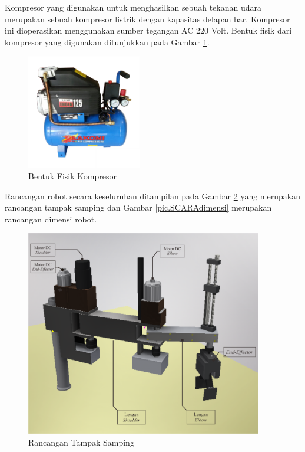 Kompresor yang digunakan untuk menghasilkan sebuah tekanan udara merupakan sebuah kompresor listrik dengan kapasitas delapan bar. Kompresor ini dioperasikan menggunakan sumber tegangan AC 220 Volt. Bentuk fisik dari kompresor yang digunakan ditunjukkan pada Gambar \ref{pic.kompresor}.
\begin{figure}[H]
	\centering
	\includegraphics[height=5cm]{gambar/kompresor.png}
	\caption{Bentuk Fisik Kompresor}
	\label{pic.kompresor}
\end{figure}

Rancangan robot secara keseluruhan ditampilan pada Gambar \ref{pic.SCARAsamping} yang merupakan rancangan tampak samping dan Gambar \ref{pic.SCARAdimensi} merupakan rancangan dimensi robot. 
\begin{figure}[H]
	\centering
	\includegraphics[height=9cm]{gambar/samping.png}
	\caption{Rancangan Tampak Samping}
	\label{pic.SCARAsamping}
\end{figure}

